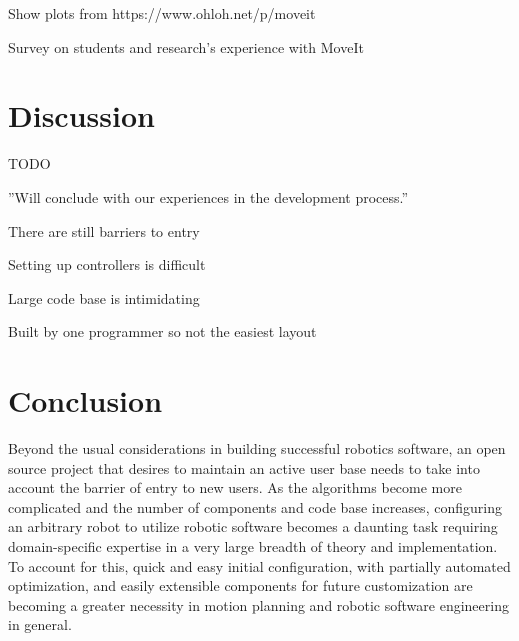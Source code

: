 \documentclass[10pt,journal,compsoc]{joser1}
\begin{document}
{Show plots from https://www.ohloh.net/p/moveit

Survey on students and research's experience with MoveIt

\section{Discussion}
\label{sec::issues}

TODO 

''Will conclude with our experiences in the development process.''

There are still barriers to entry

Setting up controllers is difficult

Large code base is intimidating

Built by one programmer so not the easiest layout

\section{Conclusion}

Beyond the usual considerations in building successful robotics software, an open source project that desires to maintain an active user base needs to take into account the barrier of entry to new users. As the algorithms become more complicated and the number of components and code base increases, configuring an arbitrary robot to utilize robotic software becomes a daunting task requiring domain-specific expertise in a very large breadth of theory and implementation. To account for this, quick and easy initial configuration, with partially automated optimization, and easily extensible components for future customization are becoming a greater necessity in motion planning and robotic software engineering in general. 

}
\end{document}
